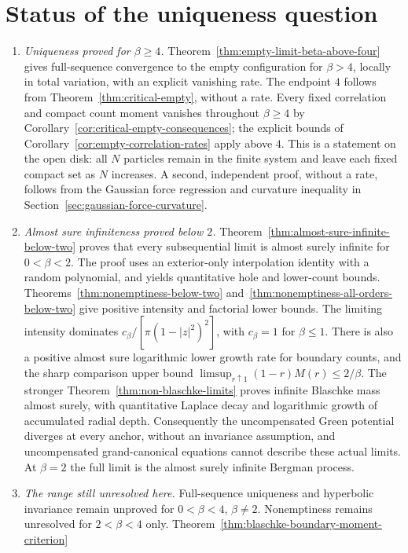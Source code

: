 \documentclass[11pt,a4paper]{article}
\numberwithin{equation}{section}
\theoremstyle{definition}
\theoremstyle{remark}
\begin{document}
\section{Status of the uniqueness question}\label{sec:limits}
\begin{enumerate}
\item \emph{Uniqueness proved for $\beta\ge4$.}
Theorem~\ref{thm:empty-limit-beta-above-four} gives full-sequence
convergence to the empty configuration for $\beta>4$, locally in total
variation, with an explicit vanishing rate. The endpoint $4$ follows
from Theorem~\ref{thm:critical-empty}, without a rate. Every fixed
correlation and compact count moment vanishes throughout $\beta\ge4$
by Corollary~\ref{cor:critical-empty-consequences}; the explicit
bounds of Corollary~\ref{cor:empty-correlation-rates} apply above $4$. This is a statement on the
open disk: all $N$ particles remain in the finite system and leave
each fixed compact set as $N$ increases. A second, independent
proof, without a rate, follows from the Gaussian force regression
and curvature inequality in Section~\ref{sec:gaussian-force-curvature}.
\item \emph{Almost sure infiniteness proved below $2$.}
Theorem~\ref{thm:almost-sure-infinite-below-two} proves that every
subsequential limit is almost surely infinite for $0<\beta<2$.
The proof uses an exterior-only interpolation identity with a random
polynomial, and yields quantitative hole and lower-count bounds.
Theorems~\ref{thm:nonemptiness-below-two}
and~\ref{thm:nonemptiness-all-orders-below-two} give positive intensity
and factorial lower bounds. The limiting intensity dominates
$c_\beta/[\pi(1-|z|^2)^2]$, with $c_\beta=1$ for $\beta\le1$.
There is also a positive almost sure logarithmic lower growth rate
for boundary counts, and the sharp comparison upper bound
$\limsup_{r\uparrow1}(1-r)M(r)\le2/\beta$.
The stronger Theorem~\ref{thm:non-blaschke-limits} proves infinite
Blaschke mass almost surely, with quantitative Laplace decay and
logarithmic growth of accumulated radial depth. Consequently the
uncompensated Green potential diverges at every anchor, without an
invariance assumption, and uncompensated grand-canonical equations
cannot describe these actual limits.
At $\beta=2$ the full limit is the almost surely infinite Bergman process.
\item \emph{The range still unresolved here.}
Full-sequence uniqueness and hyperbolic invariance remain unproved
for $0<\beta<4$, $\beta\ne2$. Nonemptiness remains unresolved for
$2<\beta<4$ only. Theorem~\ref{thm:blaschke-boundary-moment-criterion}

\end{enumerate}
\end{document}
